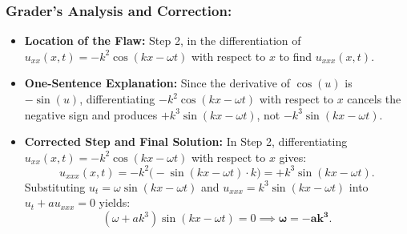 \documentclass[11pt,a4paper]{article}
\begin{document}
\subsubsection*{Grader's Analysis and Correction:}
\begin{itemize}
    \item \textbf{Location of the Flaw:} Step 2, in the differentiation of $u_{xx}(x, t) = -k^2\cos(kx - \omega t)$ with respect to $x$ to find $u_{xxx}(x, t)$.
    \item \textbf{One-Sentence Explanation:} Since the derivative of $\cos(u)$ is $-\sin(u)$, differentiating $-k^2\cos(kx - \omega t)$ with respect to $x$ cancels the negative sign and produces $+k^3\sin(kx - \omega t)$, not $-k^3\sin(kx - \omega t)$.
    \item \textbf{Corrected Step and Final Solution:}
    In Step 2, differentiating $u_{xx}(x, t) = -k^2\cos(kx - \omega t)$ with respect to $x$ gives:
    \[
        u_{xxx}(x, t) = -k^2\big(-\sin(kx - \omega t)\cdot k\big) = +k^3\sin(kx - \omega t).
    \]
    Substituting $u_t = \omega \sin(kx - \omega t)$ and $u_{xxx} = k^3\sin(kx - \omega t)$ into $u_t + a u_{xxx} = 0$ yields:
    \[
        (\omega + a k^3)\sin(kx - \omega t) = 0 \implies \mathbf{\omega = -a k^3}.
    \]
\end{itemize}
\end{document}
